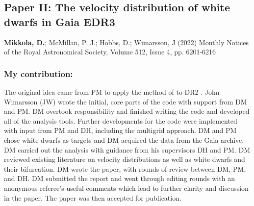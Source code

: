 \subsection*{Paper II: The velocity distribution of white dwarfs in Gaia EDR3}
\textbf{Mikkola, D.}; McMillan, P. J.; Hobbs, D.; Wimarsson, J (2022) \newline
Monthly Notices of the Royal Astronomical Society, Volume 512, Issue 4, pp. 6201-6216 \newline

\subsubsection*{My contribution:}
The original idea came from PM to apply the method of \cite{dehnen:98a} to DR2 \citep{dr2}. John Wimarsson (JW) wrote the initial, core parts of the code with support from DM and PM. DM overtook responsibility and finished writing the code and developed all of the analysis tools. Further developments for the code were implemented with input from PM and DH, including the multigrid approach. DM and PM chose white dwarfs as targets and DM acquired the data from the Gaia archive. DM carried out the analysis with guidance from his supervisors DH and PM. DM reviewed existing literature on velocity distributions as well as white dwarfs and their bifurcation. DM wrote the paper, with rounds of review between DM, PM, and DH. DM submitted the report and went through editing rounds with an anonymous referee's useful comments which lead to further clarity and discussion in the paper. The paper was then accepted for publication.